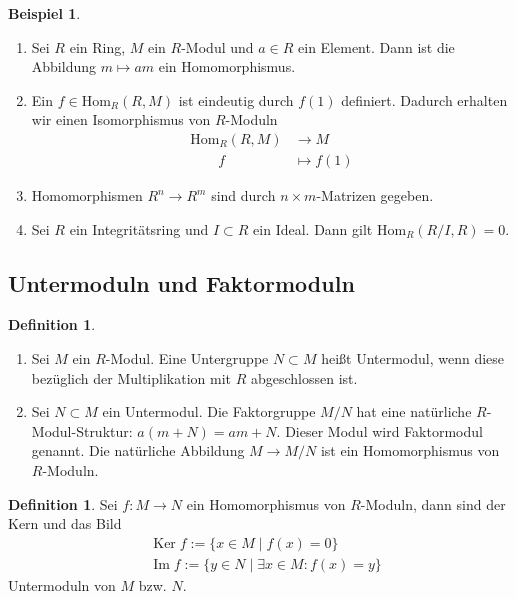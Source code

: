 \documentclass[reqno,12pt]{article}
\numberwithin{equation}{section}
\newcommand{\Hom}{\text{Hom}}
\newcommand{\Ker}{\text{Ker }}
\renewcommand{\Im}{\text{Im }}
\theoremstyle{plain}
\theoremstyle{definition}
\newtheorem{definition}[thm]{Definition}
\newtheorem{example}[thm]{Beispiel}
\renewcommand{\Ker}{\operatorname{Ker}}
\renewcommand{\Im}{\operatorname{Im}}
\begin{document}
\begin{example}
\
\begin{enumerate}
  \item Sei $R$ ein Ring, $M$ ein $R$-Modul und $a \in R$ ein Element. Dann ist die Abbildung $m \mapsto am$ ein Homomorphismus.

  \item Ein $f \in \Hom_R(R , M)$ ist eindeutig durch $f(1)$ definiert. Dadurch erhalten wir einen Isomorphismus von $R$-Moduln
  \begin{align*}
    \Hom_R(R , M) &\to  M \\
      \qquad f \qquad &\mapsto  f(1)
  \end{align*}

  \item Homomorphismen $R^n \to R^m$ sind durch $n \times m$-Matrizen gegeben.
  \item Sei $R$ ein Integritätsring und $I \subset R$ ein Ideal. Dann gilt $\Hom_R(R/I, R) = 0$.
\end{enumerate}
\end{example}







\newpage
\subsection{Untermoduln und Faktormoduln}

\begin{definition}
\
\begin{enumerate}
  \item Sei $M$ ein $R$-Modul. Eine Untergruppe $N \subset M$ heißt {\sf Untermodul}, wenn diese bezüglich der Multiplikation mit $R$ abgeschlossen ist.

  \item Sei $N \subset M$ ein Untermodul. Die Faktorgruppe $M/N$ hat eine natürliche $R$-Modul-Struktur: $a(m + N) = am + N$. Dieser Modul wird {\sf Faktormodul} genannt. Die natürliche Abbildung $M \to M/N$ ist ein Homomorphismus von $R$-Moduln.
\end{enumerate}
\end{definition}

\begin{definition}
Sei $f \colon M \to N$ ein Homomorphismus von $R$-Moduln, dann sind der {\sf Kern} und  das {\sf Bild}
\begin{align*}
&  \Ker f := \{x \in M \mid  f(x)=0 \} \\
&  \Im f := \{y \in N \mid \exists x \in M \colon f(x)=y \}
\end{align*}
Untermoduln von $M$ bzw. $N$.
\end{definition}
\end{document}
